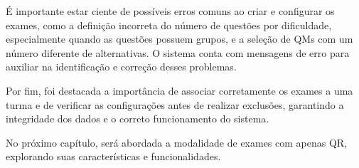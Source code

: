 É importante estar ciente de possíveis erros comuns ao criar e configurar os exames, como a definição incorreta do número de questões por dificuldade, especialmente quando as questões possuem grupos, e a seleção de QMs com um número diferente de alternativas. O sistema conta com mensagens de erro para auxiliar na identificação e correção desses problemas.

Por fim, foi destacada a importância de associar corretamente os exames a uma turma e de verificar as configurações antes de realizar exclusões, garantindo a integridade dos dados e o correto funcionamento do sistema.

No próximo capítulo, será abordada a modalidade de exames com apenas QR, explorando suas características e funcionalidades.